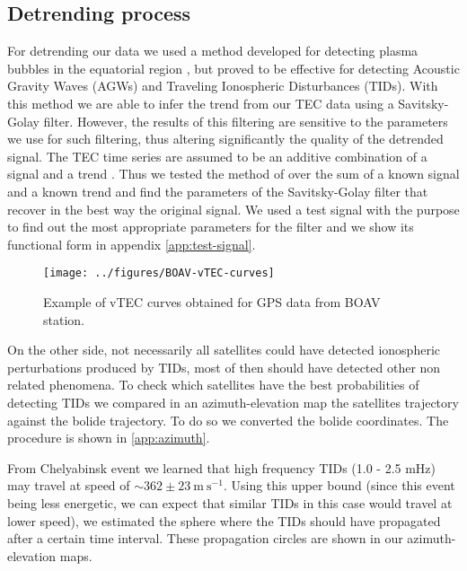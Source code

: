  \subsection{Detrending process}
 
 For detrending our data we used a method developed for detecting plasma bubbles in the equatorial region \citep{Pradipta:2015}, but proved to be effective for detecting Acoustic Gravity Waves (AGWs) and Traveling Ionospheric Disturbances (TIDs). 
 With this method we are able to infer the trend from our TEC data using a Savitsky-Golay filter. However, the results of this filtering are sensitive to the parameters we use for such filtering, thus altering significantly the quality of the detrended signal. 
 The TEC time series are assumed to be an additive combination of a signal and a trend \citep{Boris:2020}. Thus we tested the method of \citet{Pradipta:2015} over the sum of a known signal and a known trend and find the parameters of the Savitsky-Golay filter that recover in the best way the original signal. We used a test signal with the purpose to find out the most appropriate parameters for the filter and we show its functional form in appendix \ref{app:test-signal}. 


\begin{figure}
\centering
\texttt{[image: ../figures/BOAV-vTEC-curves]}
\label{fig:TEC-curve-example}
\caption{Example of vTEC curves obtained for GPS data from BOAV station.}
\end{figure}
 


On the other side, not necessarily all satellites could have detected ionospheric perturbations produced by TIDs, most of then should have detected other non related phenomena. To check which satellites have the best probabilities of detecting TIDs we compared in an azimuth-elevation map the satellites trajectory against the bolide trajectory. To do so we converted the bolide coordinates. The procedure is shown in \ref{app:azimuth}.

From Chelyabinsk event \citep{Yang:2014} we learned that high frequency TIDs (1.0 - 2.5 mHz) may travel at speed of $\sim 362 \pm 23~\mathrm{m~s^{-1}}$. Using this upper bound (since this event being less energetic, we can expect that similar TIDs in this case would travel at lower speed), we estimated the sphere where the TIDs should have propagated after a certain time interval. These propagation circles are shown in our azimuth-elevation maps.

